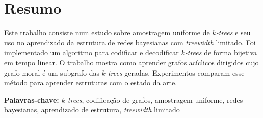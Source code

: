 \chapter*{Resumo}

Este trabalho consiste num estudo sobre amostragem uniforme de \emph{$k$-trees} e seu uso no aprendizado da estrutura de redes bayesianas com \emph{treewidth} limitado. Foi implementado um algoritmo para codificar e decodificar \emph{$k$-trees} de forma bijetiva em tempo linear. O trabalho mostra como aprender grafos acíclicos dirigidos cujo grafo moral é um subgrafo das \emph{$k$-trees} geradas. Experimentos comparam esse método para aprender estruturas com o estado da arte.

\vspace{1em}

\noindent \textbf{Palavras-chave:} \emph{$k$-trees}, codificação de grafos, amostragem uniforme, redes bayesianas, aprendizado de estrutura, \emph{treewidth} limitado
